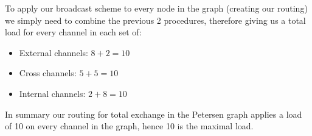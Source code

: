 To apply our broadcast scheme to every node in the graph (creating our routing) we simply need to combine the previous 2 procedures, therefore giving us a total load for every channel in each set of:
\begin{itemize}
    \item External channels:  $8+2=10$
    \item Cross channels: $5+5=10$ 
    \item Internal channels: $2+8=10$
\end{itemize}

In summary our routing for total exchange in the Petersen graph applies a load of 10 on every channel in the graph, hence 10 is the maximal load. 